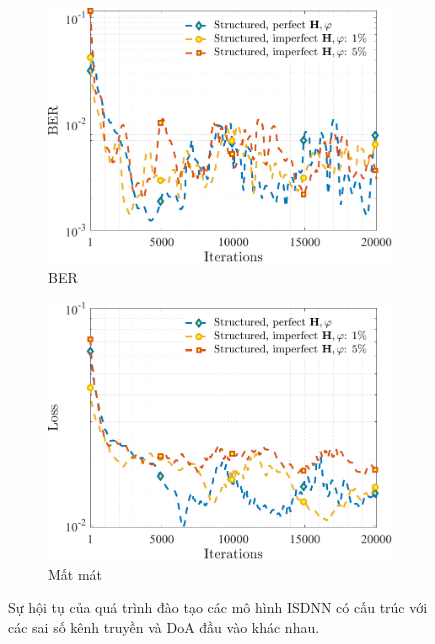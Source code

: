 \begin{figure}[ht]
     \centering
     \begin{subfigure}[b]{0.48\textwidth}
         \centering
         \includegraphics[width=\textwidth]{figures/BER_3.pdf}
         \caption{BER}
         \label{fig:ber_3}
     \end{subfigure}
     \hfill
     \begin{subfigure}[b]{0.48\textwidth}
         \centering
         \includegraphics[width=\textwidth]{figures/Loss_3.pdf}
         \caption{Mất mát}
         \label{fig:loss_3}
     \end{subfigure}
     \hfill
        \caption{Sự hội tụ của quá trình đào tạo các mô hình ISDNN có cấu trúc với các sai số kênh truyền và DoA đầu vào khác nhau.}
        \label{fig:training_3}
\end{figure}

